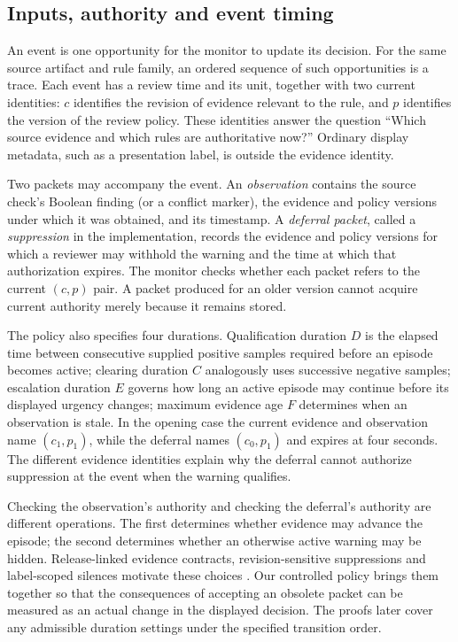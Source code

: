 \documentclass[preprint,11pt]{elsarticle}
\begin{document}
\subsection{Inputs, authority and event timing}
An event is one opportunity for the monitor to update its decision. For the same source artifact and rule family, an ordered sequence of such opportunities is a trace. Each event has a review time and its unit, together with two current identities: $c$ identifies the revision of evidence relevant to the rule, and $p$ identifies the version of the review policy. These identities answer the question ``Which source evidence and which rules are authoritative now?'' Ordinary display metadata, such as a presentation label, is outside the evidence identity.

Two packets may accompany the event. An \emph{observation} contains the source check's Boolean finding (or a conflict marker), the evidence and policy versions under which it was obtained, and its timestamp. A \emph{deferral packet}, called a \emph{suppression} in the implementation, records the evidence and policy versions for which a reviewer may withhold the warning and the time at which that authorization expires. The monitor checks whether each packet refers to the current $(c,p)$ pair. A packet produced for an older version cannot acquire current authority merely because it remains stored.

The policy also specifies four durations. Qualification duration $D$ is the elapsed time between consecutive supplied positive samples required before an episode becomes active; clearing duration $C$ analogously uses successive negative samples; escalation duration $E$ governs how long an active episode may continue before its displayed urgency changes; maximum evidence age $F$ determines when an observation is stale. In the opening case the current evidence and observation name $(c_1,p_1)$, while the deferral names $(c_0,p_1)$ and expires at four seconds. The different evidence identities explain why the deferral cannot authorize suppression at the event when the warning qualifies.

Checking the observation's authority and checking the deferral's authority are different operations. The first determines whether evidence may advance the episode; the second determines whether an otherwise active warning may be hidden. Release-linked evidence contracts, revision-sensitive suppressions and label-scoped silences motivate these choices \cite{nwekeyeng2026compliance,skillaudit2026suppression,prometheus2026alertmanager}. Our controlled policy brings them together so that the consequences of accepting an obsolete packet can be measured as an actual change in the displayed decision. The proofs later cover any admissible duration settings under the specified transition order.
\end{document}

